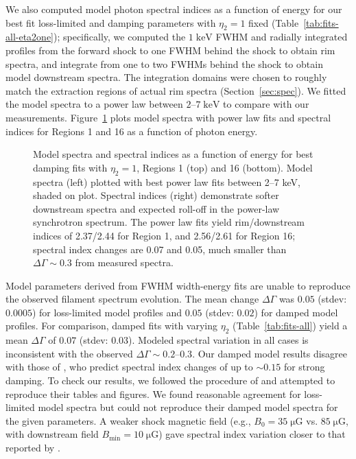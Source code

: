 \documentclass[iop, apj, numberedappendix]{emulateapj}
\newcommand*{\mt}{\mathrm}
\newcommand*{\unit}[1]{\;\mt{#1}}  %
\newcommand*{\muG}{\unit{\mu G}}
\begin{document}
We also computed model photon spectral indices as a function of energy for our
best fit loss-limited and damping parameters with $\eta_2 = 1$ fixed
(Table~\ref{tab:fits-all-eta2one}); specifically, we computed the $1
\unit{keV}$ FWHM and radially integrated profiles from the forward shock to one
FWHM behind the shock to obtain rim spectra, and integrate from one to two
FWHMs behind the shock to obtain model downstream spectra.  The integration
domains were chosen to roughly match the extraction regions of actual rim
spectra (Section~\ref{sec:spec}).  We fitted the model spectra to a power law
between $2$--$7 \unit{keV}$ to compare with our measurements.
Figure~\ref{fig:specvar} plots model spectra with power law fits and spectral
indices for Regions 1 and 16 as a function of photon energy.

\begin{figure}[h]
    \centering
    \iftoggle{manuscript}{
        \texttt{[image: figures/plt-specvar-1.pdf]} \\
        \texttt{[image: figures/plt-specvar-16.pdf]}
    }{
        \plotone{figures/plt-specvar-1.pdf} \\
        \plotone{figures/plt-specvar-16.pdf}
    }
    \caption{Model spectra and spectral indices as a function of energy for
    best damping fits with $\eta_2 = 1$, Regions 1 (top) and 16 (bottom).
    Model spectra (left) plotted with best power law fits between 2--7 keV,
    shaded on plot.  Spectral indices (right) demonstrate softer downstream
    spectra and expected roll-off in the power-law synchrotron spectrum.
    The power law fits yield rim/downstream indices of 2.37/2.44 for Region 1,
    and 2.56/2.61 for Region 16; spectral index changes are 0.07 and 0.05, much
    smaller than $\Delta\Gamma \sim 0.3$ from measured spectra.
    \label{fig:specvar}}
\end{figure}

Model parameters derived from FWHM width-energy fits are unable to reproduce
the observed filament spectrum evolution.  The mean change $\Delta\Gamma$ was
$0.05$ (stdev: $0.0005$) for loss-limited model profiles and $0.05$ (stdev:
$0.02$) for damped model profiles.  For comparison, damped fits with varying
$\eta_2$ (Table~\ref{tab:fits-all}) yield a mean $\Delta\Gamma$ of $0.07$
(stdev: $0.03$).  Modeled spectral variation in all cases is inconsistent with
the observed $\Delta\Gamma \sim 0.2$--$0.3$.
Our damped model results disagree with those of \citet[][Fig.~4]{rettig2012},
who predict spectral index changes of up to $\sim 0.15$ for strong damping.  To
check our results, we followed the procedure of \citet{rettig2012} and
attempted to reproduce their tables and figures.  We found reasonable agreement
for loss-limited model spectra but could not reproduce their damped model
spectra for the given parameters.  A weaker shock magnetic field (e.g., $B_0 =
35 \muG$ vs. $85 \muG$, with downstream field $B_{\mt{min}} = 10 \muG$) gave
spectral index variation closer to that reported by \citet{rettig2012}.
\end{document}
